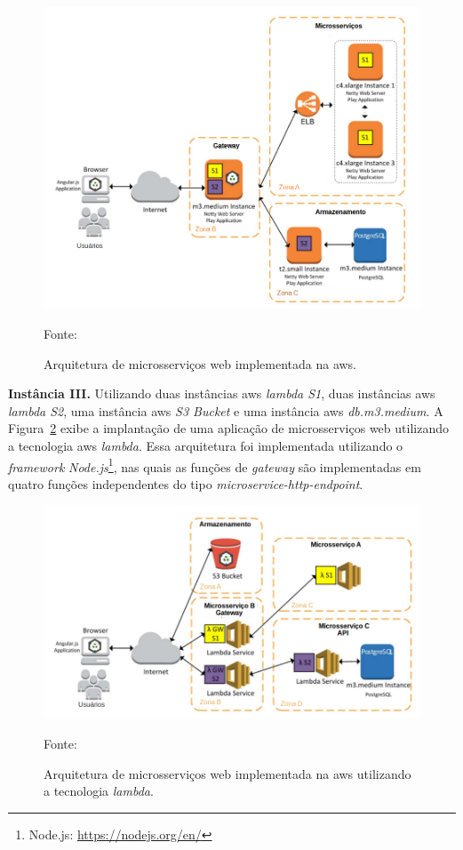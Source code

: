 \begin{figure}[htb!]
\caption{Arquitetura de microsserviços web implementada na \ac{aws}.}
\label{fig:aws_microsservicos}
\includegraphics[width=\textwidth]{img/cap2/aws_microsservicos.png}
\centering

Fonte:~\cite{7515686}
\end{figure}





\textbf{Instância III.} Utilizando duas instâncias \ac{aws} \textit{lambda S1}, duas instâncias \ac{aws} \textit{lambda S2}, uma instância \ac{aws} \textit{S3 Bucket} e uma instância \ac{aws} \textit{db.m3.medium}.
%
A Figura~\ref{fig:aws_lambda} exibe a implantação de uma aplicação de microsserviços web utilizando a tecnologia \ac{aws} \textit{lambda}. Essa arquitetura foi implementada utilizando o \textit{framework} \textit{Node.js}\footnote{Node.js: \url{https://nodejs.org/en/}}, nas quais as funções de \textit{gateway} são implementadas em quatro funções independentes do tipo \textit{microservice-http-endpoint}.
\pagebreak

\begin{figure}[htb!]
\caption{Arquitetura de microsserviços web implementada na \ac{aws} utilizando a tecnologia \textit{lambda}.}
\label{fig:aws_lambda}
\includegraphics[width=\textwidth]{img/cap2/aws_lambda.png}
\centering

Fonte:~\cite{7515686}
\end{figure}



